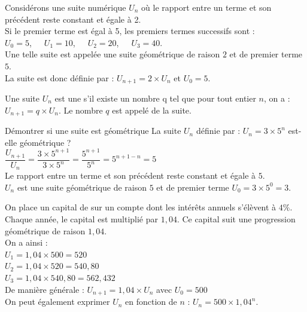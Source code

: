 \begin{exemple}
    Considérons une suite numérique $U_n$ où le rapport entre un terme et son précédent reste constant et égale à 2.\\
    Si le premier terme est égal à 5, les premiers termes successifs sont :\\
    $U_0 = 5$,\ \ \ 
    $U_1 = 10$,\ \ \ 
    $U_2 = 20$,\ \ \ 
    $U_3 = 40$.\\
    Une telle suite est appelée une suite géométrique de raison $2$ et de premier terme $5$.\\
    La suite est donc définie par : $U_{n+1}=2\times U_n$ et $U_0=5$. 
\end{exemple}

\begin{definition}
    Une suite $U_n$ est une  s'il existe un nombre q tel que pour tout entier $n$, on a : $U_{n+1}=q\times U_n$.
    Le nombre $q$ est appelé  de la suite.
\end{definition}

\begin{methodeTitre}{Démontrer si une suite est géométrique}
    La suite $U_n$ définie par : $U_n=3\times 5^n$  est-elle géométrique ?
    \ \\
    $\dfrac{U_{n+1}}{U_n} =\dfrac{3\times 5^{n+1}}{3\times 5^n}=\dfrac{5^{n+1}}{5^n} =5^{n+1-n}=5$\\
    Le rapport entre un terme et son précédent reste constant et égale à $5$.\\
    $U_n$ est une suite géométrique de raison $5$ et de premier terme $U_0=3\times 5^0=3$.
\end{methodeTitre}

\begin{exempleTitre}
    On place un capital de  sur un compte dont les intérêts annuels s'élèvent à $4\%$.
    Chaque année, le capital est multiplié par $1,04$.
    Ce capital suit une progression géométrique de raison $1,04$.\\
    
    On a ainsi :\\ 
    $U_1=1,04\times 500=520$\\		
    $U_2=1,04\times 520=540,80$\\
    $U_3=1,04\times 540,80=562,432$\\	
    De manière générale : $U_{n+1}=1,04\times U_n$ avec $U_0=500$\\ 
    On peut également exprimer $U_n$ en fonction de $n$ : $U_n= 500\times1,04^n$. 
\end{exempleTitre}

